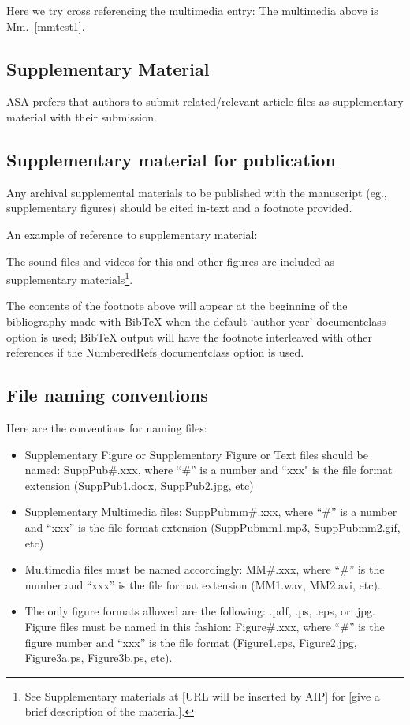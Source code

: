 \documentclass[reprint]{JASAnew}
\begin{document}
Here we try cross referencing the multimedia entry: The multimedia
above is Mm.~\ref{mmtest1}.

\subsection{Supplementary Material}
ASA
prefers that authors to submit related/relevant article files as
supplementary material with their submission.

\subsection{Supplementary material for publication}
Any archival supplemental materials to be published with the
manuscript (eg., supplementary figures) should be cited in-text and a footnote provided.

An example of reference to supplementary material:

The sound files and videos for this and other figures
are included as supplementary materials\footnote{See
Supplementary materials at [URL will be inserted by AIP]
for [give a brief description of the material].}.

The contents of the footnote above will appear at the beginning of the
bibliography made with BibTeX when the default `author-year' documentclass option is used;
BibTeX output will have the footnote interleaved with other
references if the NumberedRefs documentclass option is used.

\subsection{File naming conventions}
Here are the conventions for naming files:

\begin{itemize}
\item
Supplementary Figure or
	Supplementary Figure or Text files should be named: SuppPub\#.xxx, where ``\#'' is
	a number and ``xxx" is the file format extension
	(SuppPub1.docx, SuppPub2.jpg, etc)

\item
	Supplementary Multimedia files: SuppPubmm\#.xxx, where ``\#'' is a
	number and ``xxx'' is the file format extension (SuppPubmm1.mp3,
	SuppPubmm2.gif, etc)

\item
Multimedia files must be named accordingly: MM\#.xxx, where ``\#'' is the
number and ``xxx'' is the file format extension (MM1.wav, MM2.avi, etc).

\item
The only figure formats allowed are the following: 
.pdf, .ps, .eps, or .jpg. Figure files must be named in this fashion:
Figure\#.xxx, where ``\#'' is the figure number and ``xxx'' is the file format
(Figure1.eps, Figure2.jpg, Figure3a.ps, Figure3b.ps, etc). 

\end{itemize}
\end{document}
